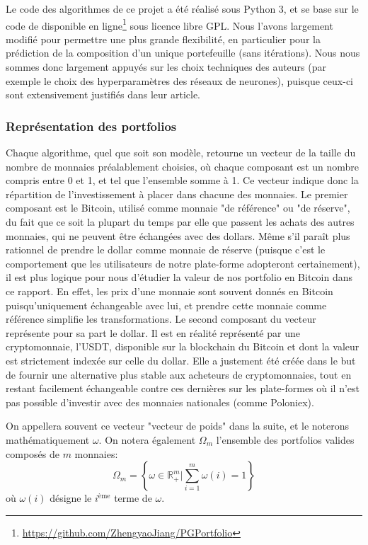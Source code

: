 \documentclass[a4paper, 10pt]{article}
\begin{document}
Le code des algorithmes de ce projet a été réalisé sous Python 3, et se base sur le code de \citet{Jiang2017} disponible en ligne\footnote{\url{https://github.com/ZhengyaoJiang/PGPortfolio}} sous licence libre GPL. Nous l'avons largement modifié pour permettre une plus grande flexibilité, en particulier pour la prédiction de la composition d'un unique portefeuille (sans itérations). Nous nous sommes donc largement appuyés sur les choix techniques des auteurs (par exemple le choix des hyperparamètres des réseaux de neurones), puisque ceux-ci sont extensivement justifiés dans leur article.

\subsubsection{Représentation des portfolios}
\label{sec:theorie_implem_rep}

Chaque algorithme, quel que soit son modèle, retourne un vecteur de la taille du nombre de monnaies préalablement choisies, où chaque composant est un nombre compris entre 0 et 1, et tel que l’ensemble somme à 1. Ce vecteur indique donc la répartition de l'investissement à placer dans chacune des monnaies. Le premier composant est le Bitcoin, utilisé comme monnaie "de référence" ou "de réserve", du fait que ce soit la plupart du temps par elle que passent les achats des autres monnaies, qui ne peuvent être échangées avec des dollars. Même s’il paraît plus rationnel de prendre le dollar comme monnaie de réserve (puisque c'est le comportement que les utilisateurs de notre plate-forme adopteront certainement), il est plus logique pour nous d'étudier la valeur de nos portfolio en Bitcoin dans ce rapport. En effet, les prix d'une monnaie sont souvent donnés en Bitcoin puisqu'uniquement échangeable avec lui, et prendre cette monnaie comme référence simplifie les transformations. Le second composant du vecteur représente pour sa part le dollar. Il est en réalité représenté par une cryptomonnaie, l’USDT, disponible sur la blockchain du Bitcoin et dont la valeur est strictement indexée sur celle du dollar. Elle a justement été créée dans le but de fournir une alternative plus stable aux acheteurs de cryptomonnaies, tout en restant facilement échangeable contre ces dernières sur les plate-formes où il n’est pas possible d’investir avec des monnaies nationales (comme Poloniex).

On appellera souvent ce vecteur "vecteur de poids" dans la suite, et le noterons mathématiquement $\omega$. On notera également $\Omega_m$ l'ensemble des portfolios valides composés de $m$ monnaies:
\begin{equation}
    \Omega_m = \left \{\omega \in \mathbb{R}_{+}^m \bigg| \sum_{i=1}^{m} \omega(i) = 1 \right \}
\end{equation}
où $\omega(i)$ désigne le $i^{\text{ème}}$ terme de $\omega$.
\end{document}
